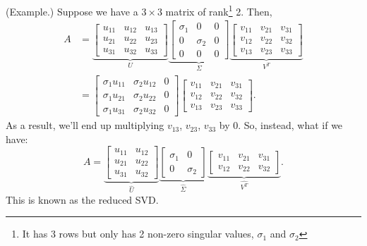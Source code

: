 \documentclass[letterpaper]{article}
\newcommand{\0}{\mathbf{0}}
\begin{document}
\begin{mdframed}
    (Example.) Suppose we have a $3 \times 3$ matrix of rank\footnote{It has 3 rows but only has 2 non-zero singular values, $\sigma_1$ and $\sigma_2$} 2. Then, 
    \begin{equation*}
        \begin{aligned}
            A &= \underbrace{\begin{bmatrix}
                u_{11} & u_{12} & u_{13} \\ 
                u_{21} & u_{22} & u_{23} \\ 
                u_{31} & u_{32} & u_{33} 
            \end{bmatrix}}_{U} \underbrace{\begin{bmatrix}
                \sigma_1 & 0 & 0 \\ 
                0 & \sigma_2 & 0 \\ 
                0 & 0 & 0 
            \end{bmatrix}}_{\Sigma} \underbrace{\begin{bmatrix}
                v_{11} & v_{21} & v_{31} \\ 
                v_{12} & v_{22} & v_{32} \\ 
                v_{13} & v_{23} & v_{33} 
            \end{bmatrix}}_{V^T} \\ 
                &= \begin{bmatrix}
                    \sigma_1 u_{11} & \sigma_2 u_{12} & 0 \\ 
                    \sigma_1 u_{21} & \sigma_2 u_{22} & 0 \\ 
                    \sigma_1 u_{31} & \sigma_2 u_{32} & 0 
                \end{bmatrix} \begin{bmatrix}
                    v_{11} & v_{21} & v_{31} \\ 
                    v_{12} & v_{22} & v_{32} \\ 
                    v_{13} & v_{23} & v_{33} 
                \end{bmatrix}.
        \end{aligned}
    \end{equation*} 
    As a result, we'll end up multiplying $v_{13}$, $v_{23}$, $v_{33}$ by 0. So, instead, what if we have: 
    \[A = \underbrace{\begin{bmatrix}
        u_{11} & u_{12} \\ 
        u_{21} & u_{22} \\ 
        u_{31} & u_{32} 
    \end{bmatrix}}_{\hat{U}} \underbrace{\begin{bmatrix}
        \sigma_1 & 0 \\ 
        0 & \sigma_2
    \end{bmatrix}}_{\hat{\Sigma}} \underbrace{\begin{bmatrix}
        v_{11} & v_{21} & v_{31} \\ 
        v_{12} & v_{22} & v_{32}
    \end{bmatrix}}_{\hat{V^T}}.\]
    This is known as the reduced SVD. 
\end{mdframed}
\end{document}

